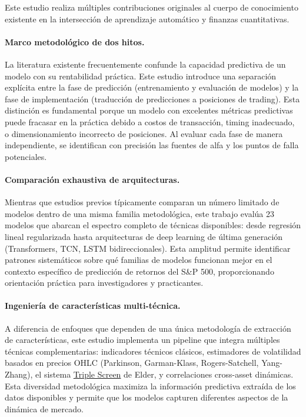 \documentclass[11pt,a4paper]{article}
\newcommand{\gterm}[2]{\hyperref[glos:#1]{#2}}
\begin{document}
Este estudio realiza múltiples contribuciones originales al cuerpo de conocimiento existente en la intersección de aprendizaje automático y finanzas cuantitativas.

\paragraph*{Marco metodológico de dos hitos.} La literatura existente frecuentemente confunde la capacidad predictiva de un modelo con su rentabilidad práctica. Este estudio introduce una separación explícita entre la fase de predicción (entrenamiento y evaluación de modelos) y la fase de implementación (traducción de predicciones a posiciones de trading). Esta distinción es fundamental porque un modelo con excelentes métricas predictivas puede fracasar en la práctica debido a costos de transacción, timing inadecuado, o dimensionamiento incorrecto de posiciones. Al evaluar cada fase de manera independiente, se identifican con precisión las fuentes de alfa y los puntos de falla potenciales.

\paragraph*{Comparación exhaustiva de arquitecturas.} Mientras que estudios previos típicamente comparan un número limitado de modelos dentro de una misma familia metodológica, este trabajo evalúa 23 modelos que abarcan el espectro completo de técnicas disponibles: desde regresión lineal regularizada hasta arquitecturas de deep learning de última generación (Transformers, TCN, LSTM bidireccionales). Esta amplitud permite identificar patrones sistemáticos sobre qué familias de modelos funcionan mejor en el contexto específico de predicción de retornos del S\&P 500, proporcionando orientación práctica para investigadores y practicantes.

\paragraph*{Ingeniería de características multi-técnica.} A diferencia de enfoques que dependen de una única metodología de extracción de características, este estudio implementa un pipeline que integra múltiples técnicas complementarias: indicadores técnicos clásicos, estimadores de volatilidad basados en precios OHLC (Parkinson, Garman-Klass, Rogers-Satchell, Yang-Zhang), el sistema \gterm{triple-screen}{Triple Screen} de Elder, y correlaciones cross-asset dinámicas. Esta diversidad metodológica maximiza la información predictiva extraída de los datos disponibles y permite que los modelos capturen diferentes aspectos de la dinámica de mercado.
\end{document}
